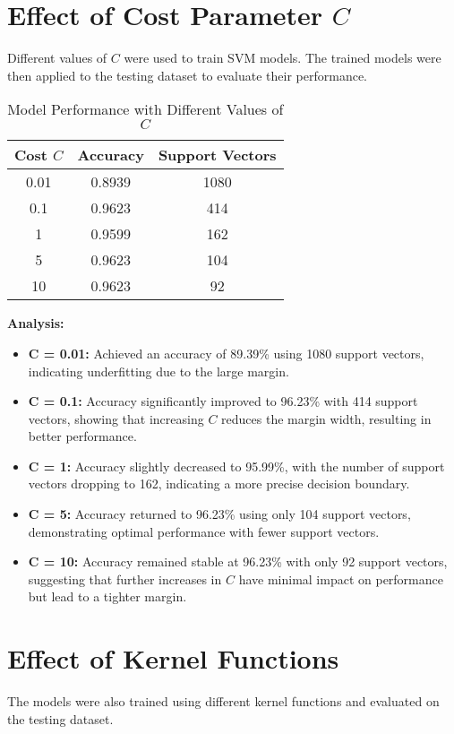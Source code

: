 \documentclass[11pt]{article}
\begin{document}
\begin{enumerate}
\begin{enumerate}
\section*{Effect of Cost Parameter \( C \)}
Different values of \( C \) were used to train SVM models. The trained models were then applied to the testing dataset to evaluate their performance.

\begin{table}[h!]
    \centering
    \begin{tabular}{|c|c|c|}
        \hline
        \textbf{Cost \( C \)} & \textbf{Accuracy} & \textbf{Support Vectors} \\
        \hline
        0.01 & 0.8939 & 1080 \\
        \hline
        0.1 & 0.9623 & 414 \\
        \hline
        1 & 0.9599 & 162 \\
        \hline
        5 & 0.9623 & 104 \\
        \hline
        10 & 0.9623 & 92 \\
        \hline
    \end{tabular}
    \caption{Model Performance with Different Values of \( C \)}
\end{table}

\textbf{Analysis:}

\begin{itemize}
    \item \textbf{C = 0.01:} Achieved an accuracy of 89.39\% using 1080 support vectors, indicating underfitting due to the large margin.
    \item \textbf{C = 0.1:} Accuracy significantly improved to 96.23\% with 414 support vectors, showing that increasing \( C \) reduces the margin width, resulting in better performance.
    \item \textbf{C = 1:} Accuracy slightly decreased to 95.99\%, with the number of support vectors dropping to 162, indicating a more precise decision boundary.
    \item \textbf{C = 5:} Accuracy returned to 96.23\% using only 104 support vectors, demonstrating optimal performance with fewer support vectors.
    \item \textbf{C = 10:} Accuracy remained stable at 96.23\% with only 92 support vectors, suggesting that further increases in \( C \) have minimal impact on performance but lead to a tighter margin.
\end{itemize}

\section*{Effect of Kernel Functions}
The models were also trained using different kernel functions and evaluated on the testing dataset.


\end{enumerate}
\end{enumerate}
\end{document}
